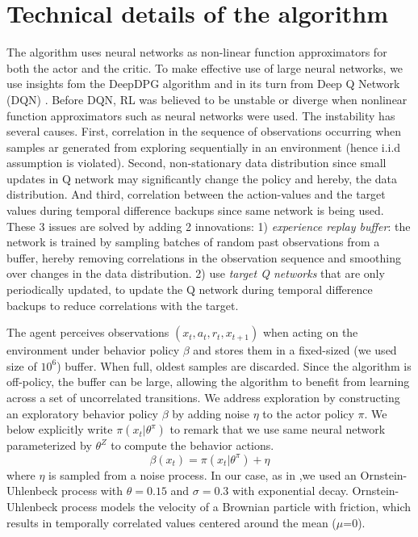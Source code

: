 \section{Technical details of the algorithm} \label{sec:technical_details}
The algorithm uses neural networks as non-linear function approximators for both the actor and the critic.
To make effective use of large neural networks, we use insights fom the DeepDPG algorithm \cite{Lillicrap2016} and in its turn
from Deep Q Network (DQN) \citep{Mnih2015}.
Before DQN, RL was believed to be unstable or diverge when nonlinear function approximators such as neural networks were used.
The instability has several causes. First, correlation in the sequence of observations occurring when
samples ar generated from exploring sequentially in an environment (hence i.i.d assumption is violated).
Second, non-stationary data distribution since small updates in Q network may significantly change the policy and hereby, the data distribution.
And third, correlation between the action-values and the target values during temporal difference backups since same network is being used.
These 3 issues are solved by adding 2 innovations: 1)  \textit{experience replay buffer}: the network is trained by sampling 
batches of random past observations from a buffer, hereby removing correlations in the observation sequence and smoothing over
changes in the data distribution.
2) use \textit{target Q networks} that are only periodically updated, to update the Q network during temporal difference backups to reduce
correlations with the target.

The agent perceives observations $(x_t,a_t,r_t,x_{t+1})$ when acting on the environment under behavior policy $\beta$ and stores them
in a fixed-sized (we used size of $10^6$) buffer. When full, oldest samples are discarded.
Since the algorithm is off-policy, the buffer can be large, allowing the algorithm to benefit from
learning across a set of uncorrelated transitions.
We address exploration by constructing an exploratory behavior policy $\beta$ by adding noise $\eta$ to the actor policy $\pi$. We below
explicitly write $\pi(x_t| \theta^\pi)$ to remark that we use same neural network parameterized by $\theta^Z$ to compute 
the behavior actions.
\begin{equation}
    \beta(x_t)=\pi(x_t| \theta^\pi) + \eta
\end{equation}
where $\eta$ is sampled from a noise process. In our case, as in \citet{Lillicrap2016},we
used an Ornstein-Uhlenbeck process \citep{Uhlenbeck1930} with $\theta = 0.15$ and $\sigma=0.3$ with exponential decay.
Ornstein-Uhlenbeck process models the velocity of a Brownian particle with friction, which results in temporally correlated
values centered around the mean ($\mu$=0).

